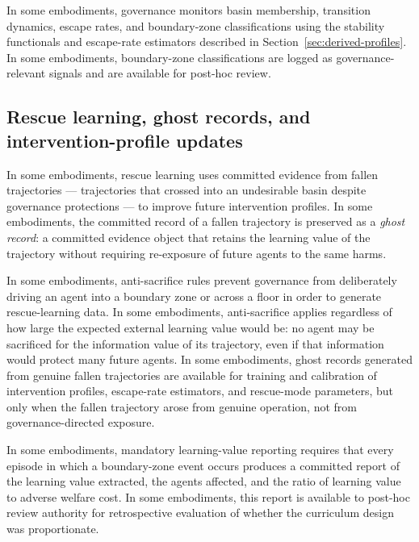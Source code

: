 \documentclass[a4paper,12pt]{article}
\begin{document}
In some embodiments, governance monitors basin membership, transition
dynamics, escape rates, and boundary-zone classifications using the
stability functionals and escape-rate estimators described in
Section~\ref{sec:derived-profiles}. In some embodiments,
boundary-zone classifications are logged as governance-relevant
signals and are available for post-hoc review.

\subsection{Rescue learning, ghost records, and intervention-profile
  updates}
\label{sec:rescue-learning}


In some embodiments, rescue learning uses committed evidence from
fallen trajectories --- trajectories that crossed into an undesirable
basin despite governance protections --- to improve future
intervention profiles. In some embodiments, the committed record of a
fallen trajectory is preserved as a \emph{ghost record}: a committed
evidence object that retains the learning value of the trajectory
without requiring re-exposure of future agents to the same harms.

In some embodiments, anti-sacrifice rules prevent governance from
deliberately driving an agent into a boundary zone or across a floor
in order to generate rescue-learning data. In some embodiments,
anti-sacrifice applies regardless of how large the expected external
learning value would be: no agent may be sacrificed for the
information value of its trajectory, even if that information would
protect many future agents. In some embodiments, ghost
records generated from genuine fallen trajectories are available for
training and calibration of intervention profiles, escape-rate
estimators, and rescue-mode parameters, but only when the fallen
trajectory arose from genuine operation, not from governance-directed
exposure.

In some embodiments, mandatory learning-value reporting requires that
every episode in which a boundary-zone event occurs produces a
committed report of the learning value extracted, the agents affected,
and the ratio of learning value to adverse welfare cost. In some
embodiments, this report is available to post-hoc review authority for
retrospective evaluation of whether the curriculum design was
proportionate.
\end{document}
